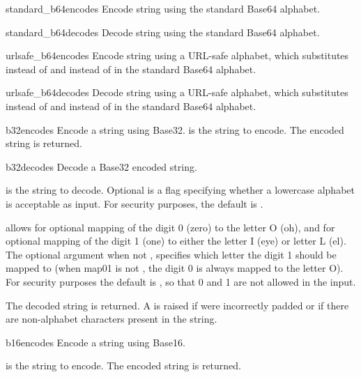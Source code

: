 \begin{funcdesc}{standard_b64encode}{s}
Encode string  using the standard Base64 alphabet.
\end{funcdesc}

\begin{funcdesc}{standard_b64decode}{s}
Decode string  using the standard Base64 alphabet.
\end{funcdesc}

\begin{funcdesc}{urlsafe_b64encode}{s}
Encode string  using a URL-safe alphabet, which substitutes
\code{-} instead of \code{+} and \code{_} instead of \code{/} in the
standard Base64 alphabet.
\end{funcdesc}

\begin{funcdesc}{urlsafe_b64decode}{s}
Decode string  using a URL-safe alphabet, which substitutes
\code{-} instead of \code{+} and \code{_} instead of \code{/} in the
standard Base64 alphabet.
\end{funcdesc}

\begin{funcdesc}{b32encode}{s}
Encode a string using Base32.   is the string to encode.  The
encoded string is returned.
\end{funcdesc}

\begin{funcdesc}{b32decode}{s}
Decode a Base32 encoded string.

 is the string to decode.  Optional  is a flag
specifying whether a lowercase alphabet is acceptable as input.  For
security purposes, the default is .

 allows for optional mapping of the digit 0 (zero) to the
letter O (oh), and for optional mapping of the digit 1 (one) to either
the letter I (eye) or letter L (el).  The optional argument
 when not , specifies which letter the digit 1 should
be mapped to (when map01 is not , the digit 0 is always
mapped to the letter O).  For security purposes the default is
, so that 0 and 1 are not allowed in the input.

The decoded string is returned.  A  is raised if
 were incorrectly padded or if there are non-alphabet characters
present in the string.
\end{funcdesc}

\begin{funcdesc}{b16encode}{s}
Encode a string using Base16.

 is the string to encode.  The encoded string is returned.
\end{funcdesc}

